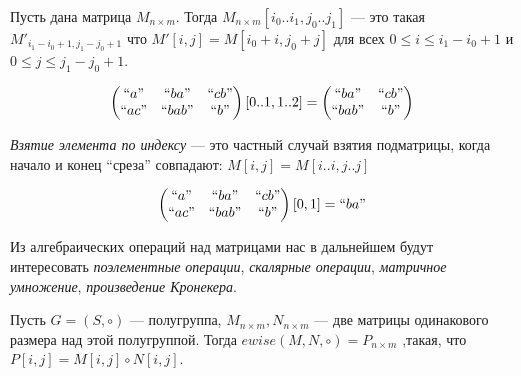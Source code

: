\begin{definition}
	Пусть дана матрица $M_{n\times m}$. Тогда
	$
		M_{n\times m}[i_0..i_1,j_0..j_1]
	$
	--- это такая $M'_{i_1 - i_0 + 1, j_1 - j_0 + 1}$ что $M'[i,j] = M[i_0 + i,j_0 + j]$ для всех $0\leq i \leq i_1 - i_0 + 1$ и $0\leq j \leq j_1 - j_0 + 1$.
\end{definition}


\begin{example}
	$$
		\begin{pmatrix}
			``a"  & ``ba"  & ``cb" \\
			``ac" & ``bab" & ``b"  \\
		\end{pmatrix}[0..1,1..2] =
		\begin{pmatrix}
			``ba"  & ``cb" \\
			``bab" & ``b"  \\
		\end{pmatrix}
	$$
\end{example}


\begin{definition}
	\emph{Взятие элемента по индексу} --- это частный случай взятия подматрицы, когда начало и конец ``среза'' совпадают:
	$
		M[i,j] = M[i..i,j..j]
	$
\end{definition}

\begin{example}
	$$
		\begin{pmatrix}
			``a"  & ``ba"  & ``cb" \\
			``ac" & ``bab" & ``b"  \\
		\end{pmatrix}[0,1] = ``ba"
	$$
\end{example}

Из алгебраических операций над матрицами нас в дальнейшем будут интересовать \textit{поэлементные операции}, \textit{скалярные операции}, \textit{матричное умножение}, \textit{произведение Кронекера}.


\begin{definition}

	Пусть $G = (S,\circ)$ --- полугруппа, $M_{n \times m}, N_{n\times m}$ --- две матрицы одинакового размера над этой полугруппой.
	Тогда
	$
		ewise(M,N,\circ) = P_{n \times m}
	$
	,такая, что $P[i,j] = M[i,j] \circ N[i,j]$.
\end{definition}



